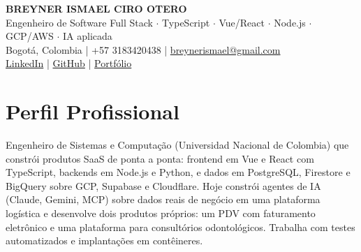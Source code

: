 \documentclass[11pt,a4paper]{article}
\begin{document}
\begin{center}
    {\huge \textbf{BREYNER ISMAEL CIRO OTERO}} \\ \vspace{0.15cm}
    {\large Engenheiro de Software Full Stack $\cdot$ TypeScript $\cdot$ Vue/React $\cdot$ Node.js $\cdot$ GCP/AWS $\cdot$ IA aplicada} \\ \vspace{0.15cm}
    Bogotá, Colombia | +57 3183420438 | \href{mailto:breynerismael@gmail.com}{breynerismael@gmail.com} \\ \vspace{0.1cm}
    \href{https://www.linkedin.com/in/breyner-ciro-38011330b/}{LinkedIn} | \href{https://github.com/breynerciro}{GitHub} | \href{https://breynerciro.github.io/}{Portfólio}
\end{center}

\vspace{0.2cm}

\section*{Perfil Profissional}
Engenheiro de Sistemas e Computação (Universidad Nacional de Colombia) que constrói produtos SaaS de ponta a ponta: frontend em Vue e React com TypeScript, backends em Node.js e Python, e dados em PostgreSQL, Firestore e BigQuery sobre GCP, Supabase e Cloudflare. Hoje constrói agentes de IA (Claude, Gemini, MCP) sobre dados reais de negócio em uma plataforma logística e desenvolve dois produtos próprios: um PDV com faturamento eletrônico e uma plataforma para consultórios odontológicos. Trabalha com testes automatizados e implantações em contêineres.
\end{document}
